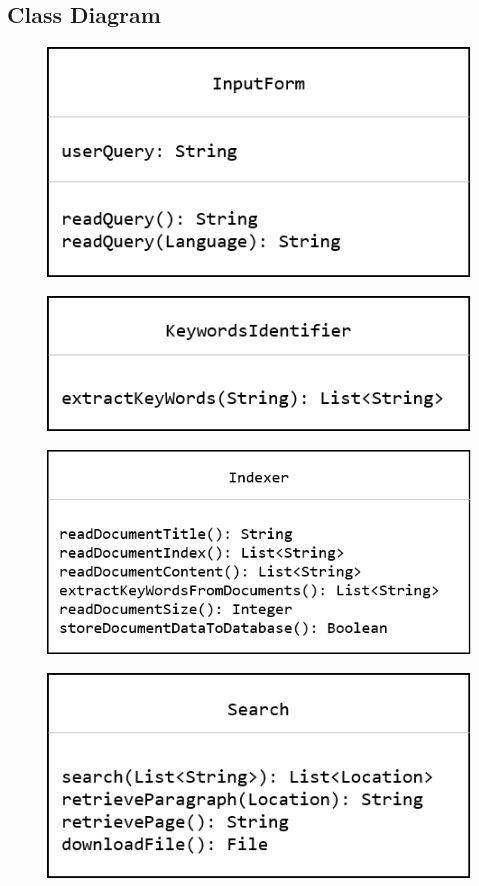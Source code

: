 \documentclass[oneside,a4paper,12pt]{report}
\begin{document}
{\subsection{Class Diagram}
\begin{figure}[H]
\includegraphics{class_input_form}
\end{figure}

\begin{figure}[H]
\includegraphics{class_keyword_identifier}
\end{figure}

\begin{figure}[H]
\includegraphics{class_indexer}
\end{figure}

\begin{figure}[H]
\includegraphics{class_search}
\end{figure}

}
\end{document}
